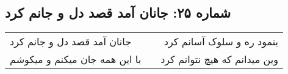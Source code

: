 \begin{center}
\section*{شماره ۲۵: جانان آمد قصد دل و جانم کرد}
\label{sec:025}
\begin{longtable}{l p{0.5cm} r}
جانان آمد قصد دل و جانم کرد
&&
بنمود ره و سلوک آسانم کرد
\\
با این همه جان میکنم و میکوشم
&&
وین میدانم که هیچ نتوانم کرد
\\
\end{longtable}
\end{center}
